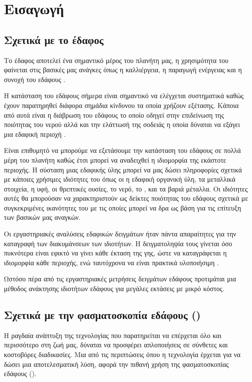 \chapter{Εισαγωγή}
\label{ch:introduction}

\section{Σχετικά με το έδαφος}
Το έδαφος αποτελεί ένα σημαντικό μέρος του πλανήτη μας, η χρησιμότητα του φαίνεται στις βασικές μας ανάγκες όπως η καλλιέργεια, η παραγωγή ενέργειας και η συνοχή του εδάφους \cite{vis_near_spectr}.

Η κατάσταση του εδάφους σήμερα είναι σημαντικό να ελέγχεται συστηματικά καθώς έχουν παρατηρηθεί διάφορα σημάδια κίνδυνου τα οποία χρήζουν εξέτασης. Κάποια από αυτά είναι η διάβρωση του εδάφους το οποίο οδηγεί στην επιδείνωση της ποιότητας του νερού αλλά και την ελάττωσή της σοδειάς η οποία δύναται να εξάγει μια εδαφική περιοχή \cite{world_soil_under_threat}.

Είναι επιθυμητό να μπορούμε να εξετάσουμε την κατάσταση του εδάφους σε πολλά μέρη του πλανήτη καθώς έτσι μπορεί να αναδειχθεί η ιδιομορφία της εκάστοτε περιοχής. Η σύσταση μιας εδαφικής ύλης μπορεί να μας δώσει πληροφορίες σχετικά με κάποιες χρήσιμες ιδιότητες του όπως οι η εδαφική οργανική ύλη, τα μεταλλικά στοιχεία, η υφή, οι θρεπτικές ουσίες, το νερό, το , και τα βαριά μέταλλα. Οι ιδιότητες αυτές θα μπορούσαν να χαρακτηριστούν ως δείκτες ποιότητας του εδάφους σχετικά με συγκεκριμένες ικανότητες του με τις οποίες μπορεί να δρα ως βάση για τις επίτευξη των βασικών μας αναγκών.

Οι εργαστηριακές αναλύσεις εδαφικών δειγμάτων ήταν πάντα απαραίτητες για την καταγραφή των διακυμάνσεων των ιδιοτήτων. Η δειγματοληψία τους γίνεται όσο πυκνότερα είναι εφικτό να γίνει κάθε έκταση της γης, ώστε να καταγράφεται η ιδιομορφία κάθε περιοχής, ενώ ταυτόχρονα να είναι πρακτικά υλοποιήσιμη \cite{soil_spectr}.

Ωστόσο πέρα από τις εργαστηριακές μετρήσεις δειγμάτων εδάφους προτιμάται μια μέθοδος ανάκτησης ιδιοτήτων εδάφους για μεγάλες εκτάσεις με μικρό κόστος.

\section{Σχετικά με την φασματοσκοπία εδάφους ()}
Η ραγδαία ανάπτυξη της τεχνολογίας που παρατηρείται να επέρχεται όλο και περισσότερο στη ζωή μας, δύναται να προσφέρει απλοποιήσεις σε σύνθετες και κοστοβόρες διαδικασίες. Μια από τις περιπτώσεις όπου η τεχνολογία έρχεται για να δώσει μια αποτελεσματική λύση, αφορά την πιθανή χρήση της φασματοσκοπίας εδάφους ().

